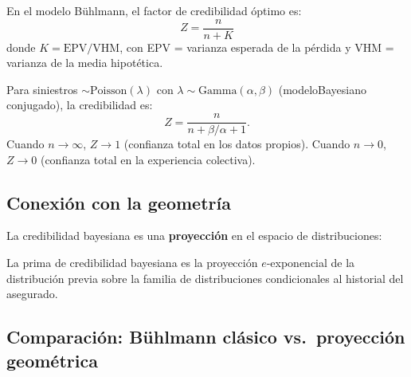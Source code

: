\begin{theorem}
	En el modelo Bühlmann, el factor de credibilidad óptimo es:
	\[
	Z = \frac{n}{n + K}
	\]
	donde $K = \text{EPV}/\text{VHM}$, con EPV = varianza esperada de la pérdida y VHM = varianza de la media hipotética.
\end{theorem}

\begin{example}
	Para siniestros $\sim \mathrm{Poisson}(\lambda)$ con $\lambda \sim \mathrm{Gamma}(\alpha, \beta)$ (modeloBayesiano conjugado), la credibilidad es:
	\[
	Z = \frac{n}{n + \beta/\alpha + 1}.
	\]
	Cuando $n \to \infty$, $Z \to 1$ (confianza total en los datos propios).  Cuando $n \to 0$, $Z \to 0$ (confianza total en la experiencia colectiva).
\end{example}

\begin{center}
\end{center}

\subsection{Conexión con la geometría}

La credibilidad bayesiana es una \textbf{proyección} en el espacio de distribuciones:

\begin{proposition}
	La prima de credibilidad bayesiana es la proyección $e$-exponencial de la distribución previa sobre la familia de distribuciones condicionales al historial del asegurado.
\end{proposition}

\subsection{Comparación: Bühlmann clásico vs.\ proyección geométrica}

